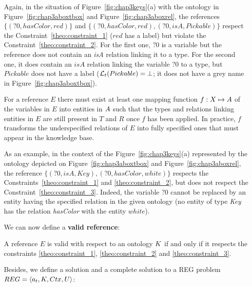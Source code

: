 \documentclass[a4paper,11pt,twoside]{StyleThese}
\begin{document}
Again, in the situation of Figure~\ref{fig:chap3keys}(a) with the ontology in Figure~\ref{fig:chap3aboxtbox} and Figure~\ref{fig:chap3aboxrel}, the references $\{(?0, hasColor, red)\}$ and $\{(?0, hasColor, red), (?0, isA, Pickable)\}$ respect the Constraint~\ref{theo:constraint_1} ($red$ has a label) but violate the Constraint~\ref{theo:constraint_2}. For the first one, $?0$ is a variable but the reference does not contain an \textit{isA} relation linking it to a type. For the second one, it does contain an $isA$ relation linking the variable $?0$ to a type, but $Pickable$ does not have a label ($\mathcal{L}_t(Pickable) = \bot$; it does not have a grey name in Figure~\ref{fig:chap3aboxtbox}).

\begin{constraint}
\label{theo:constraint_3}
For a reference $E$ there must exist at least one mapping function $f: X \mapsto A$ of the variables in $E$ into entities in $A$ such that the types and relations linking entities in $E$ are still present in $T$ and $R$ once $f$ has been applied.
In practice, $f$ transforms the underspecified relations of $E$ into fully specified ones that must appear in the knowledge base.
\end{constraint}

As an example, in the context of the Figure~\ref{fig:chap3keys}(a) represented by the ontology depicted on Figure~\ref{fig:chap3aboxtbox} and Figure~\ref{fig:chap3aboxrel}, the reference $\{(?0, isA, Key), (?0, hasColor, white)\}$ respects the Constraints~\ref{theo:constraint_1} and \ref{theo:constraint_2}, but does not respect the Constraint~\ref{theo:constraint_3}. Indeed, the variable $?0$ cannot be replaced by an entity having the specified relation in the given ontology (no entity of type \textit{Key} has the relation \textit{hasColor} with the entity $white$).

We can now define a \textbf{valid reference}:

\begin{definition}
\label{theo:valid_ref}
A reference $E$ is valid with respect to an ontology $K$ if and only if it respects the constraints \ref{theo:constraint_1}, \ref{theo:constraint_2} and \ref{theo:constraint_3}.
\end{definition}

Besides, we define a solution and a complete solution to a REG problem $REG = \langle a_t, K, Ctx, U \rangle$:
\end{document}

